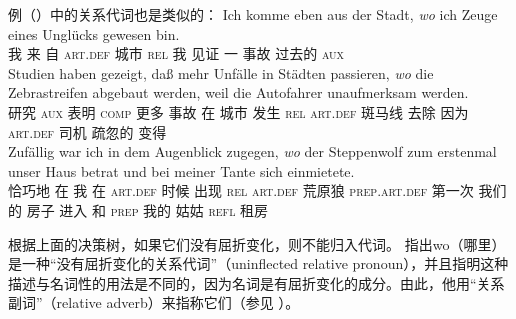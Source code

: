 例（）中的关系代词也是类似的：
\eal
\ex 
\gll Ich komme eben        aus der          Stadt, \emph{wo}    ich Zeuge eines Unglücks gewesen bin.\footnotemark\\
     我  来     \particle{} 自  \textsc{art}.\textsc{def} 城市   \textsc{rel} 我  见证  一 事故 过去的 \textsc{aux} \\
\label{bsp-wo-ich-zeuge}
\ex 
\gll Studien haben    gezeigt, daß           mehr Unfälle in       Städten passieren, \emph{wo}    die   Zebrastreifen abgebaut werden, weil die Autofahrer unaufmerksam werden.\footnotemark\\
     研究 \textsc{aux} 表明     \textsc{comp} 更多 事故 在 城市    发生        \textsc{rel} \textsc{art}.\textsc{def} 斑马线  去除 \passiveprs{} 因为 \textsc{art}.\textsc{def} 司机 疏忽的 变得\\
\ex 
\gll Zufällig war ich in dem Augenblick zugegen, \emph{wo} der Steppenwolf zum erstenmal unser Haus betrat und bei meiner Tante sich einmietete.\footnotemark\\
     恰巧地 在 我 在 \textsc{art}.\textsc{def} 时候 出现 \textsc{rel} \textsc{art}.\textsc{def} 荒原狼 \textsc{prep}.\textsc{art}.\textsc{def} 第一次 我们的 房子 进入 和 \textsc{prep} 我的 姑姑 \textsc{refl} 租房\\

\zl

根据上面的决策树，如果它们没有屈折变化，则不能归入代词。 \citet[]{Eisenberg2004a} 指出wo（哪里）是一种“没有屈折变化的关系代词”（uninflected relative pronoun），并且指明这种描述与名词性的用法是不同的，因为名词是有屈折变化的成分。由此，他用“关系副词”（relative adverb）来指称它们（参见 ）。

